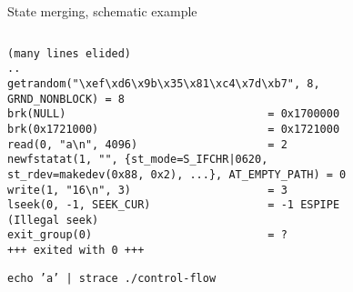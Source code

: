 \begin{frame}[fragile]
\begin{columns}[t]
\begin{column}{0.6\textwidth}
\begin{figure}
				\caption{State merging, schematic example}
			\end{figure}

		\end{column}
	\end{columns}
	\pause{}
	{\tiny
		\begin{figure}
			\begin{lstlisting}
(many lines elided)
..
getrandom("\xef\xd6\x9b\x35\x81\xc4\x7d\xb7", 8, GRND_NONBLOCK) = 8
brk(NULL)                               = 0x1700000
brk(0x1721000)                          = 0x1721000
read(0, "a\n", 4096)                    = 2
newfstatat(1, "", {st_mode=S_IFCHR|0620, st_rdev=makedev(0x88, 0x2), ...}, AT_EMPTY_PATH) = 0
write(1, "16\n", 3)                     = 3
lseek(0, -1, SEEK_CUR)                  = -1 ESPIPE (Illegal seek)
exit_group(0)                           = ?
+++ exited with 0 +++
\end{lstlisting}
			\caption{\texttt{echo 'a' | strace ./control-flow}}
		\end{figure}
	}
\end{frame}
